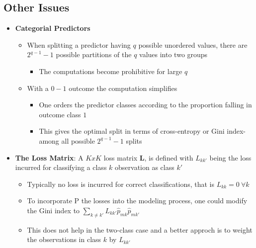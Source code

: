 \documentclass[11pt]{article}
\begin{document}
\subsection{Other Issues}
\label{sec:org6249aa2}
\begin{itemize}
\item \textbf{Categorial Predictors}
\begin{itemize}
\item When splitting a predictor having \(q\) possible unordered values, there are \(2^{q-1}-1\) possible partitions of the \(q\) values into two groups
\begin{itemize}
\item The computations become prohibitive for large \(q\)
\end{itemize}
\item With a \(0-1\)  outcome the computation simplifies
\begin{itemize}
\item One orders the predictor classes according to the proportion falling in outcome class \(1\)
\item This gives the optimal split in terms of cross-entropy or Gini index- among all possible \(2^{q-1}-1\) splits
\end{itemize}
\end{itemize}

\item \textbf{The Loss Matrix}: A \(KxK\) loss matrix \(\pmb L\), is defined with \(L_{kk'}\) being the loss incurred for classifying a class \(k\) observation as class \(k'\)
\begin{itemize}
\item Typically no loss is incurred for correct classifications, that is \(L_{kk}= 0 \ \forall k\)
\item To incorporate P the losses into the modeling process, one could modify the Gini index to \(\sum_{k\ne k'} L_{kk'} \hat p_{mk} \hat p_{mk'}\)
\item This does not help in the two-class case and a better approch is to weight the observations in class \(k\) by \(L_{kk'}\)
\end{itemize}


\end{itemize}
\end{document}
